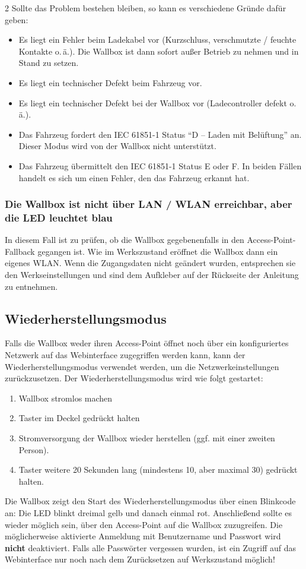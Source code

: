 \documentclass[a4paper,10pt]{article}
\begin{document}
\begin{multicols*}{2}
    Sollte das Problem bestehen bleiben, so kann es verschiedene Gründe dafür
    geben:
    \begin{itemize}
        \item Es liegt ein Fehler beim Ladekabel vor (Kurzschluss, verschmutzte / feuchte
              Kontakte o.\,ä.). Die Wallbox ist dann sofort außer Betrieb zu nehmen und
              in Stand zu setzen.
        \item Es liegt ein technischer Defekt beim Fahrzeug vor.
        \item Es liegt ein technischer Defekt bei der Wallbox vor
			(Ladecontroller defekt o.\,ä.).
        \item Das Fahrzeug fordert den IEC 61851-1 Status \enquote{D – Laden mit Belüftung}
              an. Dieser Modus wird von der Wallbox nicht unterstützt.
        \item Das Fahrzeug übermittelt den IEC 61851-1 Status E oder F. In beiden Fällen
              handelt es sich um einen Fehler, den das Fahrzeug erkannt hat.
    \end{itemize}

    \subsubsection*{Die Wallbox ist nicht über LAN / WLAN erreichbar, aber die
	LED leuchtet blau}
    In diesem Fall ist zu prüfen, ob die Wallbox gegebenenfalls in den Access-Point-Fallback
    gegangen ist. Wie im Werkszustand eröffnet die Wallbox dann ein eigenes
    WLAN. Wenn die Zugangsdaten nicht geändert wurden, entsprechen sie den Werkseinstellungen und sind dem
    Aufkleber auf der Rückseite der Anleitung zu entnehmen.


    \subsection{Wiederherstellungsmodus}\label{recovery}
    Falls die Wallbox weder ihren Access-Point öffnet noch über ein konfiguriertes Netzwerk auf das Webinterface zugegriffen werden kann,
    kann der Wiederherstellungsmodus verwendet werden, um die Netzwerkeinstellungen zurückzusetzen. Der Wiederherstellungsmodus wird wie folgt gestartet:
    \begin{enumerate}
     \item Wallbox stromlos machen
     \item Taster im Deckel gedrückt halten
     \item Stromversorgung der Wallbox wieder herstellen (ggf. mit einer zweiten Person).
     \item Taster weitere 20 Sekunden lang (mindestens 10, aber maximal 30) gedrückt halten.
    \end{enumerate}
    Die Wallbox zeigt den Start des Wiederherstellungsmodus über einen Blinkcode an: Die LED blinkt dreimal gelb und danach einmal rot. Anschließend sollte es wieder möglich sein, über den Access-Point auf die Wallbox zuzugreifen. Die möglicherweise aktivierte Anmeldung mit Benutzername und Passwort wird \textbf{nicht} deaktiviert. Falls alle Passwörter vergessen wurden, ist ein Zugriff auf das Webinterface nur noch nach dem Zurücksetzen auf Werkszustand möglich!


\end{multicols*}
\end{document}
